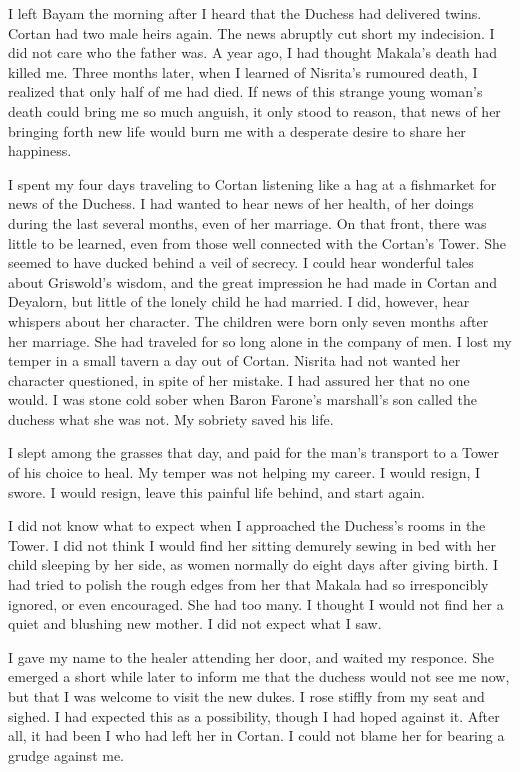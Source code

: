 \documentclass{article}
\begin{document}
I left Bayam the morning after I heard that the Duchess had delivered twins. Cortan had two male heirs again. The news abruptly cut short my indecision. I did not care who the father was. A year ago, I had thought Makala's death had killed me. Three months later, when I learned of Nisrita's rumoured death, I realized that only half of me had died. If news of this strange young woman's death could bring me so much anguish, it only stood to reason, that news of her bringing forth new life would burn me with a desperate desire to share her happiness. 

I spent my four days traveling to Cortan listening like a hag at a fishmarket for news of the Duchess. I had wanted to hear news of her health, of her doings during the last several months, even of her marriage. On that front, there was little to be learned, even from those well connected with the Cortan's Tower.  She seemed to have ducked behind a veil of secrecy. I could hear wonderful tales about Griswold's wisdom, and the great impression he had made in Cortan and Deyalorn, but little of the lonely child he had married. I did, however, hear whispers about her character. The children were born only seven months after her marriage. She had traveled for so long alone in the company of men. I lost my temper in a small tavern a day out of Cortan. Nisrita had not wanted her character questioned, in spite of her mistake. I had assured her that no one would. I was stone cold sober when Baron Farone's marshall's son called the duchess what she was not. My sobriety saved his life. 

I slept among the grasses that day, and paid for the man's transport to a Tower of his choice to heal. My temper was not helping my career. I would resign, I swore. I would resign, leave this painful life behind, and start again.

\vspace{.5 cm}

I did not know what to expect when I approached the Duchess's rooms in the Tower. I did not think I would find her sitting demurely sewing in bed with her child sleeping by her side, as women normally do eight days after giving birth. I had tried to polish the rough edges from her that Makala had so irresponcibly ignored, or even encouraged. She had too many. I thought I would not find her a quiet and  blushing new mother. I did not expect what I saw.

I gave my name to the healer attending her door, and waited my responce. She emerged a short while later to inform me that the duchess would not see me now, but that I was welcome to visit the new dukes. I rose stiffly from my seat and sighed. I had expected this as a possibility, though I had hoped against it. After all, it had been I who had left her in Cortan. I could not blame her for bearing a grudge against me. 
\end{document}
